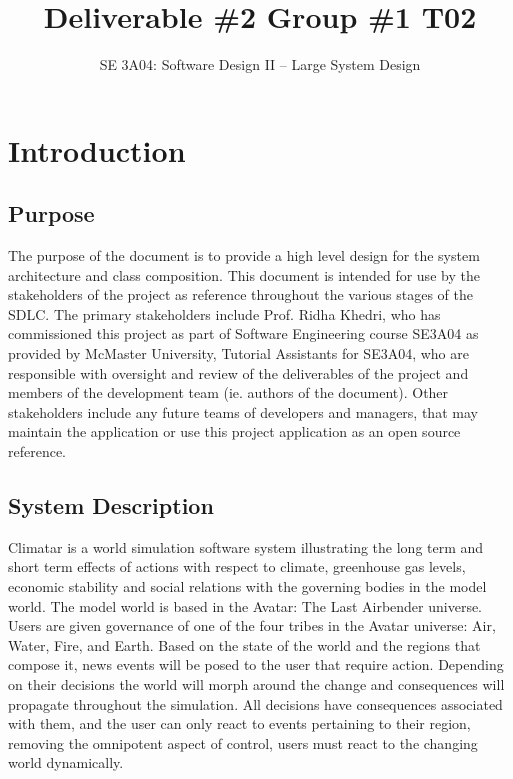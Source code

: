 \documentclass[]{article}
\title{Deliverable \#2 Group \#1 T02}
\author{SE 3A04: Software Design II -- Large System Design}
\date{}
\begin{document}
\maketitle

\section{Introduction}
\label{sec:introduction}

\subsection{Purpose}
\label{sub:purpose}
The purpose of the document is to provide a high level design for the system architecture and class composition. This document is intended for use by the stakeholders of the project as reference throughout the various stages of the SDLC. The primary stakeholders include Prof. Ridha Khedri, who has commissioned this project as part of Software Engineering course SE3A04 as provided by McMaster University, Tutorial Assistants for SE3A04, who are responsible with oversight and review of the deliverables of the project and members of the development team (ie. authors of the document). Other stakeholders include any future teams of developers and managers, that may maintain the application or use this project application as an open source reference.


\subsection{System Description}
\label{sub:system_description}
Climatar is a world simulation software system illustrating the long term and short term effects of actions with respect to climate, greenhouse gas levels, economic stability and social relations with the governing bodies in the model world. The model world is based in the Avatar: The Last Airbender universe. Users are given governance of one of the four tribes in the Avatar universe: Air, Water, Fire, and Earth. Based on the state of the world and the regions that compose it, news events will be posed to the user that require action. Depending on their decisions the world will morph around the change and consequences will propagate throughout the simulation. All decisions have consequences associated with them, and the user can only react to events pertaining to their region, removing the omnipotent aspect of control, users must react to the changing world dynamically.
\end{document}
